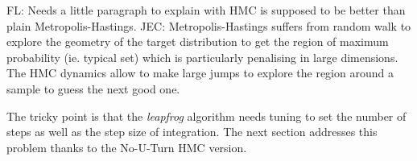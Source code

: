 \documentclass[twocolumn,twocolappendix,nofootinbib,iop]{openjournal}
\newcommand{\FrL}[1]{{\color{cyan}FL: #1}}
\newcommand{\JEC}[1]{{\color{magenta}JEC: #1}}
\newcommand{\jaxcosmo}{\texttt{jax-cosmo}}
\begin{document}
\FrL{Needs a little paragraph to explain with HMC is supposed to be better than plain Metropolis-Hastings.}
\JEC{Metropolis-Hastings suffers from random walk to explore the geometry of the target distribution to get the region of maximum probability (ie. typical set) which is particularly  penalising in large dimensions. The HMC dynamics allow to make large jumps to explore the region around a sample to guess the next good one.}

The tricky point is that the \textit{leapfrog} algorithm needs tuning to set the number of steps as well as the step size of integration. The next section addresses this problem thanks to the No-U-Turn HMC version.



%
%
%
%
\end{document}
